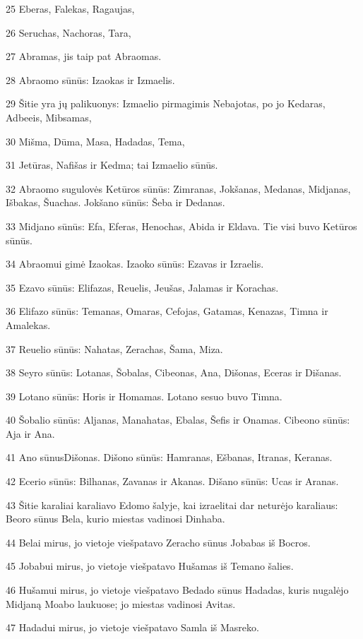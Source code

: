 \par 25 Eberas, Falekas, Ragaujas, 
\par 26 Seruchas, Nachoras, Tara, 
\par 27 Abramas, jis taip pat Abraomas. 
\par 28 Abraomo sūnūs: Izaokas ir Izmaelis. 
\par 29 Šitie yra jų palikuonys: Izmaelio pirmagimis Nebajotas, po jo Kedaras, Adbeeis, Mibsamas, 
\par 30 Mišma, Dūma, Masa, Hadadas, Tema, 
\par 31 Jetūras, Nafišas ir Kedma; tai Izmaelio sūnūs. 
\par 32 Abraomo sugulovės Ketūros sūnūs: Zimranas, Jokšanas, Medanas, Midjanas, Išbakas, Šuachas. Jokšano sūnūs: Šeba ir Dedanas. 
\par 33 Midjano sūnūs: Efa, Eferas, Henochas, Abida ir Eldava. Tie visi buvo Ketūros sūnūs. 
\par 34 Abraomui gimė Izaokas. Izaoko sūnūs: Ezavas ir Izraelis. 
\par 35 Ezavo sūnūs: Elifazas, Reuelis, Jeušas, Jalamas ir Korachas. 
\par 36 Elifazo sūnūs: Temanas, Omaras, Cefojas, Gatamas, Kenazas, Timna ir Amalekas. 
\par 37 Reuelio sūnūs: Nahatas, Zerachas, Šama, Miza. 
\par 38 Seyro sūnūs: Lotanas, Šobalas, Cibeonas, Ana, Dišonas, Eceras ir Dišanas. 
\par 39 Lotano sūnūs: Horis ir Homamas. Lotano sesuo buvo Timna. 
\par 40 Šobalio sūnūs: Aljanas, Manahatas, Ebalas, Šefis ir Onamas. Cibeono sūnūs: Aja ir Ana. 
\par 41 Ano sūnus­Dišonas. Dišono sūnūs: Hamranas, Ešbanas, Itranas, Keranas. 
\par 42 Ecerio sūnūs: Bilhanas, Zavanas ir Akanas. Dišano sūnūs: Ucas ir Aranas. 
\par 43 Šitie karaliai karaliavo Edomo šalyje, kai izraelitai dar neturėjo karaliaus: Beoro sūnus Bela, kurio miestas vadinosi Dinhaba. 
\par 44 Belai mirus, jo vietoje viešpatavo Zeracho sūnus Jobabas iš Bocros. 
\par 45 Jobabui mirus, jo vietoje viešpatavo Hušamas iš Temano šalies. 
\par 46 Hušamui mirus, jo vietoje viešpatavo Bedado sūnus Hadadas, kuris nugalėjo Midjaną Moabo laukuose; jo miestas vadinosi Avitas. 
\par 47 Hadadui mirus, jo vietoje viešpatavo Samla iš Masreko. 

